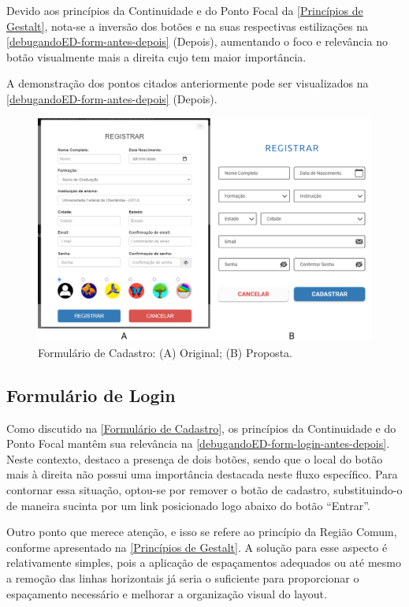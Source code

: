 Devido aos princípios da Continuidade e do Ponto Focal da \autoref{Princípios de Gestalt}, nota-se a inversão dos botões e na suas respectivas estilizações na \autoref{debugandoED-form-antes-depois} (Depois), aumentando o foco e relevância no botão visualmente mais a direita cujo tem maior importância.

A demonstração dos pontos citados anteriormente pode ser visualizados na \autoref{debugandoED-form-antes-depois} (Depois).

\begin{figure}[htb]
    \begin{center}
	    \includegraphics[scale=0.35]{figs/debugandoED-form-antes-depois.png}
	\end{center}
    \caption{\label{debugandoED-form-antes-depois}Formulário de Cadastro: (A) Original; (B) Proposta.}
\end{figure}

\subsection{Formulário de Login}
\label{Formulário de Login}
Como discutido na \autoref{Formulário de Cadastro}, os princípios da Continuidade e do Ponto Focal mantêm sua relevância na \autoref{debugandoED-form-login-antes-depois}. Neste contexto, destaco a presença de dois botões, sendo que o local do botão mais à direita não possui uma importância destacada neste fluxo específico. Para contornar essa situação, optou-se por remover o botão de cadastro, substituindo-o de maneira sucinta por um link posicionado logo abaixo do botão “Entrar”.

Outro ponto que merece atenção, e isso se refere ao princípio da Região Comum, conforme apresentado na \autoref{Princípios de Gestalt}. A solução para esse aspecto é relativamente simples, pois a aplicação de espaçamentos adequados ou até mesmo a remoção das linhas horizontais já seria o suficiente para proporcionar o espaçamento necessário e melhorar a organização visual do layout.

